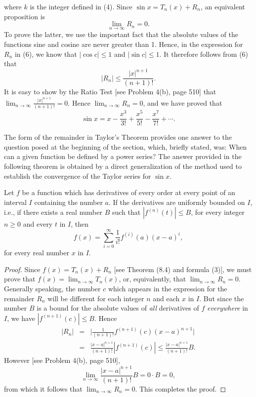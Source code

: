 \begin{example}
\noindent where $k$ is the integer defined in (4). Since $\sin x = T_n(x) + R_n$, an equivalent proposition is
$$
\lim_{n \rightarrow \infty} R_n = 0 .
$$
\noindent To prove the latter, we use the important fact that the absolute values of the functions sine and cosine are never greater than 1. Hence, in the expression for $R_n$ in (6), we know that $|\cos c| \leq 1$ and $|\sin c| \leq 1$. It therefore follows from (6) that
$$
|R_n| \leq \frac{|x|^{n+1}}{(n+1)!}.
$$
\noindent It is easy to show by the Ratio Test [see Problem 4(b), page 510] that $\lim_{n \rightarrow \infty} \frac{|x|^{n+1}}{(n+1)!}  = 0$. Hence $\lim_{n \rightarrow \infty} R_n = 0$, and we have proved that
$$
\sin x = x - \frac{x^3}{3!} + \frac{x^5}{5!} - \frac{x^7}{7!} + \cdots .
$$
\end{example}

The form of the remainder in Taylor's Theorem provides one answer to the question posed at the beginning of the section, which, briefly stated, was: When can a given function be defined by a power series? The answer provided in the following theorem is obtained by a direct
generalization of the method used to establish the convergence of the Taylor series for $\sin x$.

\begin{theorem} 
Let $f$ be a function which has derivatives of every order at every point of an interval $I$ containing the number $a$. If the derivatives are uniformly bounded on $I$, i.e., if there exists a real number $B$ such that $|f^{(n)}(t)| \leq B$, for every integer $n \geq 0$ and every $t$ in $I$, then
$$
f(x) = \sum_{i=0}^\infty \frac{1}{i!} f^{(i)}(a)(x - a)^i,
$$
\noindent for every real number $x$ in $I$.
\end{theorem}

\begin{proof}
Since $f(x) = T_n(x) + R_n$ [see Theorem (8.4) and formula (3)], we must prove that $f(x) = \lim_{n \rightarrow \infty} T_n(x)$, or, equivalently, that $\lim_{n \rightarrow \infty} R_n = 0$. Generally speaking, the number $c$ which appears in the expression for the remainder $R_n$ will be different for each integer $n$ and each $x$ in $I$. But since the number $B$ is a bound for the absolute values of \textit{all} derivatives of $f$ \textit{everywhere} in $I$, we have $|f^{(n+1)}(c)| \leq B$. Hence
\begin{eqnarray*}
|R_n| &=&  \Big|\frac{1}{(n+1)!} f^{(n+1)} (c) (x-a)^{n+1}\Big|\\
          &=&  \frac{|x - a|^{n+1}}{(n+1)!}|f^{(n+1)} (c)| \leq \frac{|x - a|^{n+1}}{(n+1)!} B.
\end{eqnarray*} 
However [see Problem 4(b), page 510],
$$
\lim_{n \rightarrow \infty} \frac{|x - a|^{n+1}}{(n+1)!} B = 0 \cdot B = 0,
$$
from which it follows that $\lim_{n \rightarrow \infty} R_n = 0$. This completes the proof.  
\end{proof}

